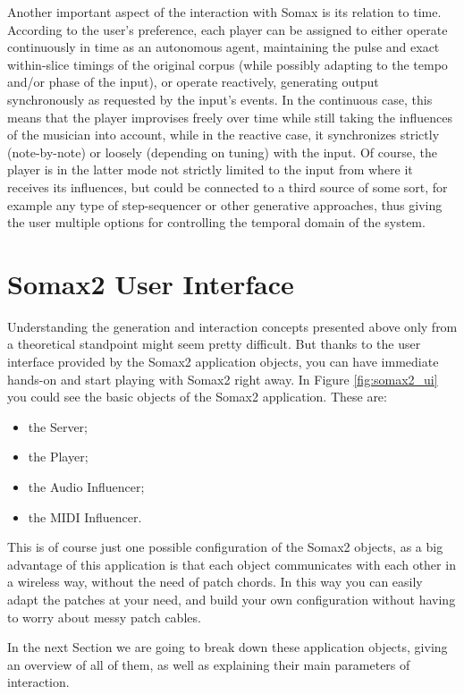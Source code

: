 Another important aspect of the interaction with Somax is its relation to time. According to the user's preference, each player can be assigned to either operate continuously in time as an autonomous agent, maintaining the pulse and exact within-slice timings of the original corpus (while possibly adapting to the tempo and/or phase of the input), or operate reactively, generating output synchronously as requested by the input's events. In the continuous case, this means that the player improvises freely over time while still taking the influences of the musician into account, while in the reactive case, it synchronizes strictly (note-by-note) or loosely (depending on tuning) with the input. Of course, the player is in the latter mode not strictly limited to the input from where it receives its influences, but could be connected to a third source of some sort, for example any type of step-sequencer or other generative approaches, thus giving the user multiple options for controlling the temporal domain of the system.

\section{Somax2 User Interface}

Understanding the generation and interaction concepts presented above only from a theoretical standpoint might seem pretty difficult. But thanks to the user interface provided by the Somax2 application objects, you can have immediate hands-on and start playing with Somax2 right away.
In Figure \ref{fig:somax2_ui} you could see the basic objects of the Somax2 application. These are:
\begin{itemize}
    \item the Server;
    \item the Player;
    \item the Audio Influencer;
    \item the MIDI Influencer.
\end{itemize}

This is of course just one possible configuration of the Somax2 objects, as a big advantage of this application is that each object communicates with each other in a wireless way, without the need of patch chords. In this way you can easily adapt the patches at your need, and build your own configuration without having to worry about messy patch cables.

In the next Section we are going to break down these application objects, giving an overview of all of them, as well as explaining their main parameters of interaction.


